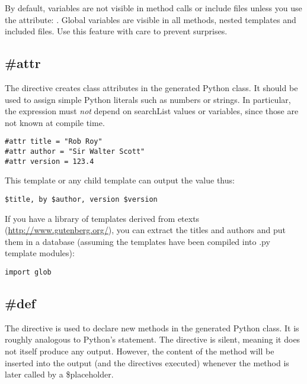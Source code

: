 By default,  variables are not visible in method calls or include
files unless you use the  attribute: .  Global variables are visible in all methods, nested templates and
included files.  Use this feature with care to prevent surprises.


\subsection{\#attr}
\label{inheritanceEtc.attr}

The  directive creates class attributes in the generated Python
class.  It should be used to assign simple Python literals such as numbers or
strings.  In particular, the expression must {\em not} depend on searchList
values or  variables, since those are not known at compile time.

\begin{verbatim}
#attr title = "Rob Roy"
#attr author = "Sir Walter Scott"
#attr version = 123.4
\end{verbatim}

This template or any child template can output the value thus:
\begin{verbatim}
$title, by $author, version $version
\end{verbatim}

If you have a library of templates derived from etexts
(\url{http://www.gutenberg.org/}), you can extract the titles and authors
and put them in a database (assuming the templates have been compiled into
.py template modules):

\begin{verbatim}
import glob

\end{verbatim}


\subsection{\#def}
\label{inheritanceEtc.def}

The  directive is used to declare new methods in the generated
Python class.  It is roughly analogous to Python's  statement.  
The directive is silent, meaning it does not itself produce any output.
However, the content of the method will be inserted into the output (and the
directives executed) whenever the method is later called by a \$placeholder.

